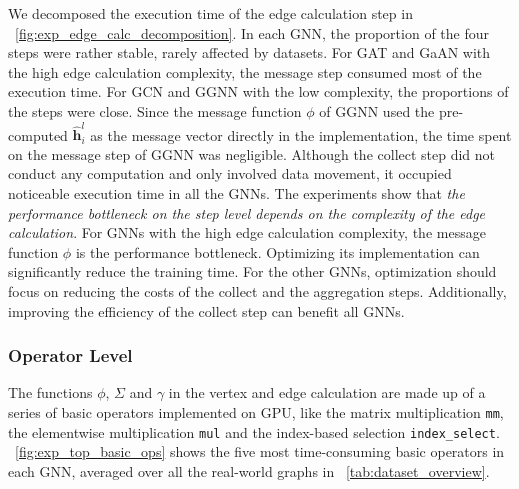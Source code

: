 We decomposed the execution time of the edge calculation step in \figurename~\ref{fig:exp_edge_calc_decomposition}.
In each GNN, the proportion of the four steps were rather stable, rarely affected by datasets.
For GAT and GaAN with the high edge calculation complexity, the message step consumed most of the execution time.
For GCN and GGNN with the low complexity, the proportions of the steps were close.
Since the message function $\phi$ of GGNN used the pre-computed $\hat{\boldsymbol{h}}^l_i$ as the message vector directly in the implementation, the time spent on the message step of GGNN was negligible.
Although the collect step did not conduct any computation and only involved data movement, it occupied noticeable execution time in all the GNNs.
The experiments show that \emph{the performance bottleneck on the step level depends on the complexity of the edge calculation}.
For GNNs with the high edge calculation complexity, the message function $\phi$ is the performance bottleneck.
Optimizing its implementation can significantly reduce the training time.
For the other GNNs, optimization should focus on reducing the costs of the collect and the aggregation steps.
Additionally, improving the efficiency of the collect step can benefit all GNNs.

\subsubsection{Operator Level}

The functions $\phi$, $\Sigma$ and $\gamma$ in the vertex and edge calculation are made up of a series of basic operators implemented on GPU, like the matrix multiplication \texttt{mm}, the elementwise multiplication \texttt{mul} and the index-based selection \texttt{index\_select}.
\figurename~\ref{fig:exp_top_basic_ops} shows the five most time-consuming basic operators in each GNN, averaged over all the real-world graphs in \tablename~\ref{tab:dataset_overview}.

